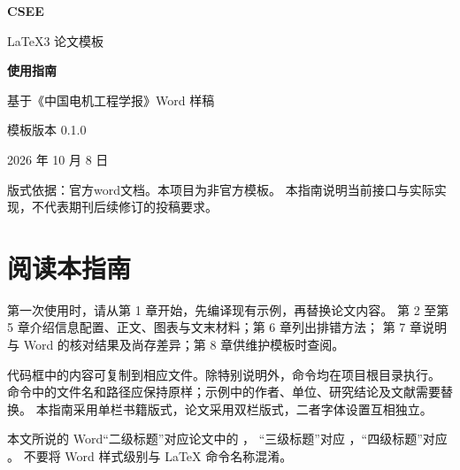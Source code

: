 \documentclass[a4paper,oneside,openany,zihao=-4,fontset=fandol]{ctexbook}
\newcommand{\file}[1]{\texttt{\detokenize{#1}}}
\begin{document}
\begin{titlepage}
  \centering
  \vspace*{2cm}
  {\color{manualblue}\fontsize{34}{42}\selectfont\bfseries CSEE\par}
  \vspace{0.5cm}
  {\Large LaTeX3 论文模板\par}
  \vspace{2cm}
  {\Huge\bfseries 使用指南\par}
  \vspace{0.8cm}
  {\large 基于《中国电机工程学报》Word 样稿\par}
  \vfill
  {\large 模板版本 0.1.0\par}
  \vspace{0.3cm}
  {2026 年 10 月 8 日\par}
  \vspace{1cm}
  \begin{minipage}{0.85\textwidth}\small
  版式依据：官方word文档。本项目为非官方模板。
  本指南说明当前接口与实际实现，不代表期刊后续修订的投稿要求。
  \end{minipage}
\end{titlepage}
\frontmatter
\chapter{阅读本指南}
第一次使用时，请从第 1 章开始，先编译现有示例，再替换论文内容。
第 2 至第 5 章介绍信息配置、正文、图表与文末材料；第 6 章列出排错方法；
第 7 章说明与 Word 的核对结果及尚存差异；第 8 章供维护模板时查阅。

代码框中的内容可复制到相应文件。除特别说明外，命令均在项目根目录执行。
命令中的文件名和路径应保持原样；示例中的作者、单位、研究结论及文献需要替换。
本指南采用单栏书籍版式，论文采用双栏版式，二者字体设置互相独立。

本文所说的 Word“二级标题”对应论文中的 \file{\section}，
“三级标题”对应 \file{\subsection}，“四级标题”对应 \file{\subsubsection}。
不要将 Word 样式级别与 LaTeX 命令名称混淆。

\begingroup\linespread{1}\small\hypersetup{linkcolor=manualtoc,linktoc=all}
\tableofcontents\endgroup
\mainmatter
\end{document}
